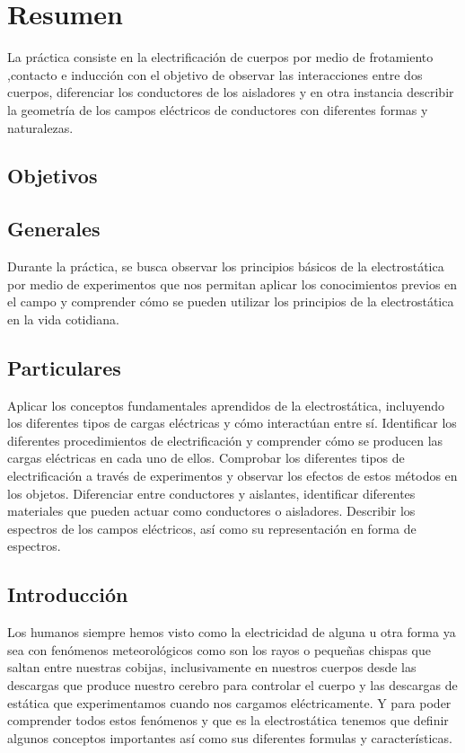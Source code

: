\documentclass[14pt]{article}
\begin{document}
	\section{Resumen}
	La práctica consiste en la electrificación de cuerpos por medio de frotamiento ,contacto e inducción con el objetivo de observar las interacciones entre dos cuerpos, diferenciar los conductores de los aisladores y en otra instancia describir la geometría de los campos eléctricos de conductores con diferentes formas y naturalezas.
	\begin{multicols}{2}
	
		\section{Objetivos} 
	\subsection{Generales} 
	

	Durante la práctica, se busca observar los principios básicos de la electrostática por medio de experimentos que nos permitan aplicar los conocimientos previos en el campo y comprender cómo se pueden utilizar los principios de la electrostática en la vida cotidiana.
	\subsection{Particulares}
	Aplicar los conceptos fundamentales aprendidos de la electrostática, incluyendo los diferentes tipos de cargas eléctricas y cómo interactúan entre sí.
Identificar los diferentes procedimientos de electrificación y comprender cómo se producen las cargas eléctricas en cada uno de ellos.
Comprobar los diferentes tipos de electrificación a través de experimentos y observar los efectos de estos métodos en los objetos.
Diferenciar entre conductores y aislantes, identificar diferentes materiales que pueden actuar como conductores o aisladores.
Describir los espectros de los campos eléctricos, así como su representación en forma de espectros.
	\subsection{Introducción}
	Los humanos siempre hemos visto como la electricidad de alguna u otra forma ya sea con fenómenos meteorológicos como son los rayos o pequeñas chispas que saltan entre nuestras cobijas, inclusivamente en nuestros cuerpos desde las descargas que produce nuestro cerebro para controlar el cuerpo y las descargas de estática que experimentamos cuando nos cargamos eléctricamente. Y para poder comprender todos estos fenómenos y que es la electrostática tenemos que definir algunos conceptos importantes así como sus diferentes formulas y características. 

\end{multicols}
\end{document}
